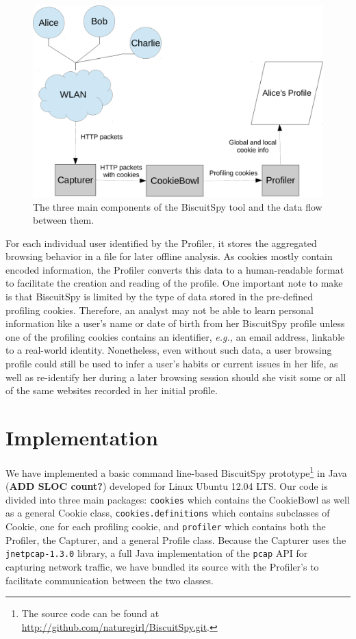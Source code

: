 \begin{figure}[h]
\centering
\includegraphics[scale=0.5]{./diagrams/dataflow.pdf}
\caption{The three main components of the BiscuitSpy tool and the data flow between them.}
\label{fig:dataflow}
\end{figure}

For each individual user identified by the Profiler, it stores the aggregated browsing behavior in a file for later offline analysis.
As cookies mostly contain encoded information, the Profiler converts this data to a human-readable format to facilitate the creation and reading of the profile.
One important note to make is that BiscuitSpy is limited by the type of data stored in the pre-defined profiling cookies.
Therefore, an analyst may not be able to learn personal information like a user's name or date of birth from her BiscuitSpy profile unless one of the profiling cookies contains an identifier, \emph{e.g.,} an email address, linkable to a real-world identity.
Nonetheless, even without such data, a user browsing profile could still be used to infer a user's habits or current issues in her life, as well as re-identify her during a later browsing session should she visit some or all of the same websites recorded in her initial profile.


\section{Implementation}
\label{sec:implementation}

We have implemented a basic command line-based BiscuitSpy prototype\footnote{The source code can be found at \url{http://github.com/naturegirl/BiscuitSpy.git}.} in Java (\textbf{ADD SLOC count?}) developed for Linux Ubuntu 12.04 LTS.
Our code is divided into three main packages: \texttt{cookies} which contains the CookieBowl as well as a general Cookie class, \texttt{cookies.definitions} which contains subclasses of Cookie, one for each profiling cookie, and \texttt{profiler} which contains both the Profiler, the Capturer, and a general Profile class.
Because the Capturer uses the \texttt{jnetpcap-1.3.0} library, a full Java implementation of the \texttt{pcap} API for capturing network traffic, we have bundled its source with the Profiler's to facilitate communication between the two classes.

